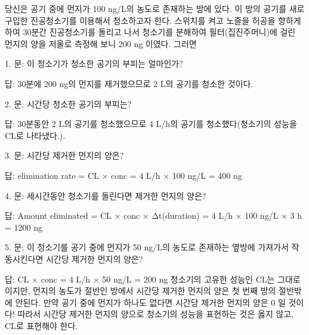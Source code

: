 \documentclass[
  11pt,
  krantz2, a4paper, twoside]{krantz}
\makeatletter
\newenvironment{kframe}{%
\medskip{}
\setlength{\fboxsep}{.8em}
 \def\at@end@of@kframe{}%
 \ifinner\ifhmode%
  \def\at@end@of@kframe{\end{minipage}}%
  \begin{minipage}{\columnwidth}%
 \fi\fi%
 \def\FrameCommand##1{\hskip\@totalleftmargin \hskip-\fboxsep
 \colorbox{shadecolor}{##1}\hskip-\fboxsep
     \hskip-\linewidth \hskip-\@totalleftmargin \hskip\columnwidth}%
 \MakeFramed {\advance\hsize-\width
   \@totalleftmargin\z@ \linewidth\hsize
   \@setminipage}}%
 {\par\unskip\endMakeFramed%
 \at@end@of@kframe}
\newenvironment{rmdblock}[1]
  {
  \begin{itemize}
  \renewcommand{\labelitemi}{
    \raisebox{-.7\height}[0pt][0pt]{
      {\setkeys{Gin}{width=3em,keepaspectratio}\texttt{[image: images/\#1]}}
    }
  }
  \setlength{\fboxsep}{1em}
  \begin{kframe}
  \item
  }
  {
  \end{kframe}
  \end{itemize}
  }
\newenvironment{rmdtip}
  {\begin{rmdblock}{tip}}
  {\end{rmdblock}}
\theoremstyle{definition}
\theoremstyle{definition}
\theoremstyle{definition}
\theoremstyle{definition}
\theoremstyle{remark}
\makeatother
\begin{document}
당신은 공기 중에 먼지가 100 ng/L의 농도로 존재하는 방에 있다. 이 방의 공기를 새로 구입한 진공청소기를 이용해서 청소하고자 한다.
스위치를 켜고 노즐을 허공을 향하게 하여 30분간 진공청소기를 돌리고 나서 청소기를 분해하여 필터(집진주머니)에 걸린 먼지의 양을 저울로 측정해 보니 200 ng 이였다.
그러면

\begin{rmdtip}
1. 문: 이 청소기가 청소한 공기의 부피는 얼마인가?

답: 30분에 200 ng의 먼지를 제거했으므로 2 L의 공기를 청소한 것이다.
\end{rmdtip}

\begin{rmdtip}
2. 문: 시간당 청소한 공기의 부피는?

답: 30분동안 2 L의 공기를 청소했으므로 4 L/h의 공기를 청소했다(청소기의 성능을 CL로 나타냈다.).
\end{rmdtip}

\begin{rmdtip}
3. 문: 시간당 제거한 먼지의 양은?

답: elimination rate = CL × conc = 4 L/h × 100 ng/L = 400 ng
\end{rmdtip}

\begin{rmdtip}
4. 문: 세시간동안 청소기를 돌린다면 제거한 먼지의 양은?

답: Amount eliminated = CL × conc × Δt(duration) = 4 L/h × 100 ng/L × 3 h = 1200 ng
\end{rmdtip}

\begin{rmdtip}
5. 문: 이 청소기를 공기 중에 먼지가 50 ng/L의 농도로 존재하는 옆방에 가져가서 작동시킨다면 시간당 제거한 먼지의 양은?

답: CL × conc = 4 L/h × 50 ng/L = 200 ng 청소기의 고유한 성능인 CL는
그대로이지만, 먼지의 농도가 절반인 방에서 시간당 제거한 먼지의 양은
첫 번째 방의 절반밖에 안된다. 만약 공기 중에 먼지가 하나도 없다면
시간당 제거한 먼지의 양은 0 일 것이다! 따라서 시간당 제거한 먼지의
양으로 청소기의 성능을 표현하는 것은 옳지 않고, CL로 표현해야 한다.
\end{rmdtip}
\end{document}
